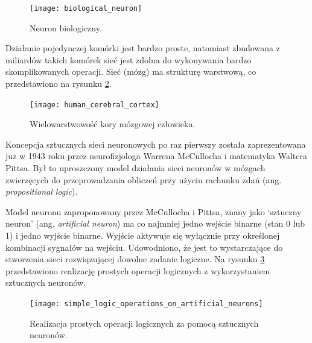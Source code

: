 \documentclass[a4paper,12pt]{article}
\numberwithin{figure}{section}
\begin{document}
    \bigskip

    \begin{figure}[H]
        \centering
        \texttt{[image: biological\_neuron]}
        \caption{Neuron biologiczny\cite{UczenieMaszynowe2018}.}
        \label{fig:biological_neuron}
    \end{figure}

    \bigskip

    Działanie pojedynczej komórki jest bardzo proste, natomiast zbudowana z miliardów takich komórek sieć jest zdolna do wykonywania bardzo skomplikowanych operacji. Sieć (mózg) ma strukturę warstwową, co przedstawiono na rysunku \ref{fig:human_cerebral_cortex}\cite{UczenieMaszynowe2018}.

    \bigskip

    \begin{figure}[H]
        \centering
        \texttt{[image: human\_cerebral\_cortex]}
        \caption{Wielowarstwowość kory mózgowej człowieka\cite{UczenieMaszynowe2018}.}
        \label{fig:human_cerebral_cortex}
    \end{figure}

    \bigskip

    Koncepcja sztucznych sieci neuronowych po raz pierwszy została zaprezentowana już w 1943 roku przez neurofizjologa Warrena McCullocha i matematyka Waltera Pittsa\cite{BeginningsOfANN1943}. Był to uproszczony model działania sieci neuronów w mózgach zwierzęcych do przeprowadzania obliczeń przy użyciu rachunku zdań (ang. \textit{propositional logic})\cite{UczenieMaszynowe2018}.

    \bigskip

    Model neuronu zaproponowany przez McCullocha i Pittsa, znany jako `sztuczny neuron' (ang. \textit{artificial neuron}) ma co najmniej jedno wejście binarne (stan 0 lub 1) i jedno wyjście binarne. Wyjście aktywuje się wyłącznie przy określonej kombinacji sygnałów na wejściu. Udowodniono, że jest to wystarczające do stworzenia sieci rozwiązującej dowolne zadanie logiczne\cite{UczenieMaszynowe2018}. Na rysunku \ref{fig:simple_logic_operations_on_artificial_neurons} przedstawiono realizację prostych operacji logicznych z wykorzystaniem sztucznych neuronów.

    \bigskip

    \begin{figure}[H]
        \centering
        \texttt{[image: simple\_logic\_operations\_on\_artificial\_neurons]}
        \caption{Realizacja prostych operacji logicznych za pomocą sztucznych neuronów\cite{UczenieMaszynowe2018}.}
        \label{fig:simple_logic_operations_on_artificial_neurons}
    \end{figure}
\end{document}
